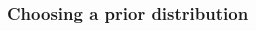 \documentclass[12pt]{article}
\begin{document}
\begin{spacing}{2.0}







    \subsubsection*{Choosing a prior distribution}  


\end{spacing}
\end{document}

